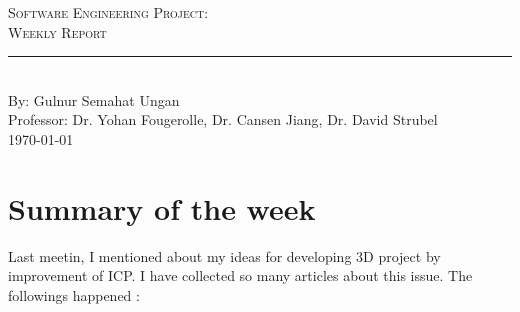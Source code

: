 \documentclass[aps,letterpaper,11pt]{revtex4}
\newcommand{\labno}{Software Engineering Project}
\newcommand{\labtitle}{Weekly Report}
\newcommand{\authorname}{Gulnur Semahat Ungan}
\newcommand{\professor}{Dr. Yohan Fougerolle, Dr. Cansen Jiang, Dr. David Strubel}
\begin{document}
  
\begin{titlepage}
\begin{center}
{\LARGE \textsc{\labno:} \\ \vspace{4pt}}
{\Large \textsc{\labtitle} \\ \vspace{4pt}} 
\rule[13pt]{\textwidth}{1pt} \\ \vspace{150pt}
{\large By: \authorname \\ \vspace{10pt}
Professor: \professor \\ \vspace{10pt}
\today}
\end{center}




\end{titlepage}%
\newpage

\section{Summary of the week}
Last meetin, I mentioned about my ideas for developing 3D project by improvement of ICP. I have collected so many articles about this issue. The followings happened : 
\end{document}
